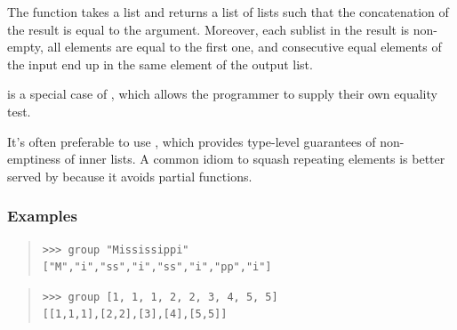 \begin{haddockdesc}
\item[\begin{tabular}{@{}l}
group :: Eq a => {\char 91}a{\char 93} -> {\char 91}{\char 91}a{\char 93}{\char 93}
\end{tabular}]
{\haddockbegindoc
The  function takes a list and returns a list of lists such
 that the concatenation of the result is equal to the argument.  Moreover,
 each sublist in the result is non-empty, all elements are equal to the
 first one, and consecutive equal elements of the input end up in the
 same element of the output list.\par
{} is a special case of , which allows the programmer to supply
 their own equality test.\par
It's often preferable to use ,
 which provides type-level guarantees of non-emptiness of inner lists.
 A common idiom to squash repeating elements    
 is better served by
    
 because it avoids partial functions.\par
\subsubsection*{\textbf{Examples}}
\begin{quote}
{\haddockverb\begin{verbatim}
>>> group "Mississippi"
["M","i","ss","i","ss","i","pp","i"]

\end{verbatim}}
\end{quote}
\begin{quote}
{\haddockverb\begin{verbatim}
>>> group [1, 1, 1, 2, 2, 3, 4, 5, 5]
[[1,1,1],[2,2],[3],[4],[5,5]]

\end{verbatim}}
\end{quote}}
\end{haddockdesc}
